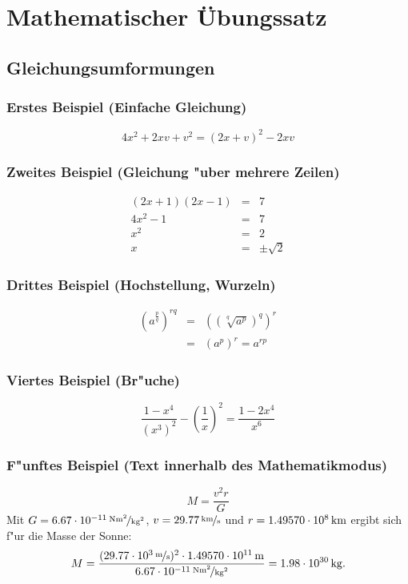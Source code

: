 \documentclass[a4paper,11pt]{article}
\begin{document}
\section{Mathematischer \"Ubungssatz}
\subsection{Gleichungsumformungen}
\subsubsection{Erstes Beispiel (Einfache Gleichung)}
\begin{equation}
4x^2 + 2xv + v^2 = (2x + v)^2 - 2xv
\end{equation}
%
\subsubsection{Zweites Beispiel (Gleichung "uber mehrere Zeilen)}
\begin{eqnarray}
  (2x + 1)(2x - 1) & = & 7 \nonumber \\
          4x^2 - 1 & = & 7 \nonumber \\
             x^2   & = & 2 \nonumber \\
                x  & = & \pm\sqrt{2}
\end{eqnarray}
%
\subsubsection{Drittes Beispiel (Hochstellung, Wurzeln)}
\begin{eqnarray}
\left(a^{\frac{p}{q}}\right)^{rq} & = & \left(\left(\sqrt[q]{a^p}\right)^q\right)^r \nonumber \\
&= &\left(a^p\right)^r = a^{rp}
\end{eqnarray}
%
\subsubsection{Viertes Beispiel (Br"uche)}
\begin{equation}
\frac{1-x^4}{(x^3)^2} - \left(\frac{1}{x}\right)^2 = \frac{1-2x^4}{x^6}
\end{equation}
%
\subsubsection{F"unftes Beispiel (Text innerhalb des Mathematikmodus)}
\begin{equation}
  M=\frac{v^2r}G
\end{equation}
Mit $G=\unitfrac[6.67\cdot 10^{-11}]{Nm^2}{kg^2}$, $v=\unitfrac[29.77]{km}{s}$ und $r=\unit[1.49570\cdot 10^8]{km}$
ergibt sich f"ur die Masse der Sonne:
\begin{equation}
  M=\frac{(\unitfrac[29.77\cdot 10^3]{m}{s})^2\cdot \unit[1.49570\cdot 10^{11}]{m}}{\unitfrac[6.67\cdot 10^{-11}]{Nm^2}{kg^2}}
   =\unit[1.98\cdot 10^{30}]{kg}.
\end{equation}
%
\end{document}
